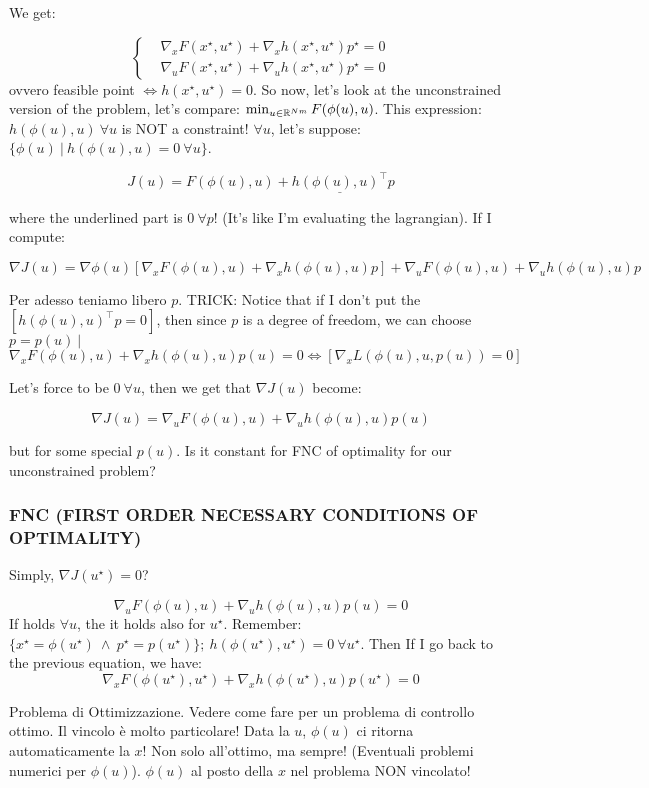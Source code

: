We get:

\[
	\left\{
	\begin{aligned}
	&\nabla_x{F(x^\star,u^\star)} + \nabla_x{h(x^\star,u^\star)}p^\star = 0\\
	&\nabla_u{F(x^\star,u^\star)} + \nabla_u{h(x^\star,u^\star)}p^\star = 0
	\end{aligned}
	\right.
\]
ovvero feasible point $\iff h(x^\star,u^\star) = 0$. So now, let's look at the unconstrained version of the problem, let's compare: $\min_{u\in\mathbb{R}^{Nm}}{F(\phi(u),u)}$. This expression: $h(\phi(u),u)\ \forall u$ is NOT a constraint! $\forall u$, let's suppose: $\{\phi(u)\ |\ h(\phi(u),u) = 0\ \forall u\}$.

\[
	J(u) = F(\phi(u),u) + \underline{h(\phi(u),u)^\top} p
\]

where the underlined part is $0\ \forall p$! (It's like I'm evaluating the lagrangian). If I compute:

\[ 
	\nabla{J(u)} = \nabla{\phi(u)}[\nabla_x{F(\phi(u),u)} + \nabla_x{h(\phi(u),u)}p] + \nabla_u{F(\phi(u),u)} + \nabla_u{h(\phi(u),u)}p
\]

Per adesso teniamo libero $p$. TRICK: Notice that if I don't put the $[h(\phi(u),u)^\top p=0]$, then since $p$ is a degree of freedom, we can choose $p=p(u)\ |$
\[
	\nabla_x{F(\phi(u),u)} + \nabla_x{h(\phi(u),u)}p(u) = 0 \iff [\nabla_x{L(\phi(u),u,p(u))} = 0]
\]

Let's force to be $0\ \forall u$, then we get that $\nabla{J(u)}$ become:

\[
	\nabla{J(u)} = \nabla_u{F(\phi(u),u)} + \nabla_u{h(\phi(u),u)}p(u)
\]

but for some special $p(u)$. Is it constant for FNC of optimality for our unconstrained problem?

\subsubsection{FNC (FIRST ORDER NECESSARY CONDITIONS OF OPTIMALITY)}

Simply, $\nabla{J(u^\star)} = 0$?

\[
	\nabla_u{F(\phi(u),u)} + \nabla_u{h(\phi(u),u)}p(u) = 0
\]
If holds $\forall u$, the it holds also for $u^\star$.
Remember: $\{x^\star = \phi(u^\star)\ \land\ p^\star = p(u^\star)\};\ h(\phi(u^\star),u^\star) = 0\ \forall u^\star$. Then If I go back to the previous equation, we have:
\[
	\nabla_x{F(\phi(u^\star),u^\star)} + \nabla_x{h(\phi(u^\star),u)}p(u^\star) = 0
\]

Problema di Ottimizzazione. Vedere come fare per un problema di controllo ottimo. Il vincolo è molto particolare! Data la $u$, $\phi(u)$ ci ritorna automaticamente la $x$! Non solo all'ottimo, ma sempre! (Eventuali problemi numerici per $\phi(u)$). $\phi(u)$ al posto della $x$ nel problema NON vincolato!

